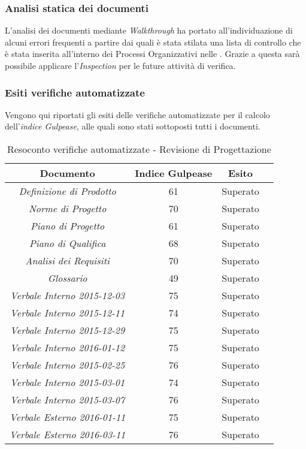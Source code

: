 \subsubsection{Analisi statica dei documenti}
L'analisi dei documenti mediante \textit{Walkthrough} ha portato all'individuazione di alcuni errori frequenti a partire dai quali è stata stilata una lista di controllo che è stata inserita all'interno dei Processi Organizzativi nelle \textit{\NdP}. Grazie a questa sarà possibile applicare l'\textit{Inspection} per le future attività di verifica.

\subsubsection{Esiti verifiche automatizzate}
Vengono qui riportati gli esiti delle verifiche automatizzate per il calcolo dell'\textit{indice Gulpease}, alle quali sono stati sottoposti tutti i documenti.
\begin{table}[h]
\begin{center}
\begin{tabular}{|c|c|c|c|}
\hline Documento & Indice Gulpease & Esito\\
\hline
\emph{Definizione di Prodotto} & 61 & Superato \\
\emph{Norme di Progetto} & 70 & Superato \\
\emph{Piano di Progetto} & 61 & Superato \\
\emph{Piano di Qualifica} & 68 & Superato \\
\emph{Analisi dei Requisiti} & 70 & Superato \\
\emph{Glossario} & 49 & Superato \\
\emph{Verbale Interno 2015-12-03} & 75 & Superato \\
\emph{Verbale Interno 2015-12-11} & 74 & Superato \\
\emph{Verbale Interno 2015-12-29} & 75 & Superato \\
\emph{Verbale Interno 2016-01-12} & 75 & Superato \\
\emph{Verbale Interno 2015-02-25} & 76 & Superato \\
\emph{Verbale Interno 2015-03-01} & 74 & Superato \\
\emph{Verbale Interno 2015-03-07} & 76 & Superato \\
\emph{Verbale Esterno 2016-01-11} & 75 & Superato \\
\emph{Verbale Esterno 2016-03-11} & 76 & Superato \\
\hline
\end{tabular}
\caption{Resoconto verifiche automatizzate - Revisione di Progettazione}
\end{center}
\end{table}

